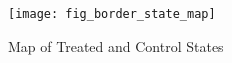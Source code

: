 \begin{figure}[H]
    \centering
    \texttt{[image: fig\_border\_state\_map]}
    \caption{Map of Treated and Control States}
    \label{fig:border-state-map}
\end{figure}